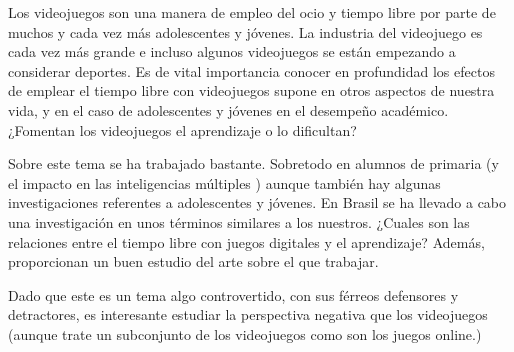 \documentclass[palatino,nochap]{apuntesURJC}
\begin{document}
Los videojuegos son una manera de empleo del ocio y tiempo libre por parte de muchos y cada vez más adolescentes y jóvenes. 
%
La industria del videojuego es cada vez más grande e incluso algunos videojuegos se están empezando a considerar deportes.
%
Es de vital importancia conocer en profundidad los efectos de emplear el tiempo libre con videojuegos supone en otros aspectos de nuestra vida, y en el caso de adolescentes y jóvenes en el desempeño académico. 
%
¿Fomentan los videojuegos el aprendizaje o lo dificultan?


Sobre este tema se ha trabajado bastante. 
%
Sobretodo en alumnos de primaria (y el impacto en las inteligencias múltiples \cite{del2015videogames} ) aunque también hay algunas investigaciones referentes a adolescentes y jóvenes.
%
En Brasil se ha llevado a cabo una investigación \cite{PimenPimen2014xw} en unos términos similares a los nuestros. 
%
¿Cuales son las relaciones entre el tiempo libre con juegos digitales y el aprendizaje? 
%
Además, proporcionan un buen estudio del arte sobre el que trabajar.

Dado que este es un tema algo controvertido, con sus férreos defensores y detractores, es interesante estudiar la perspectiva negativa que los videojuegos \cite{OnlineGamesYoung} (aunque trate un subconjunto de los videojuegos como son los juegos online.)











\printindex
\end{document}
